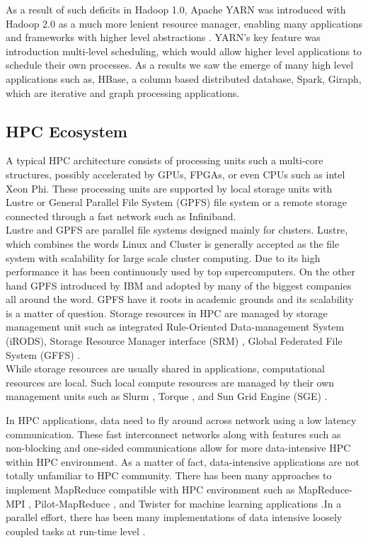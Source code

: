 \documentclass[runningheads,a4paper]{llncs}
\begin{document}
As a result of such deficits in Hadoop 1.0, Apache YARN was introduced with Hadoop 2.0 as a much more lenient resource manager, enabling many applications and frameworks with higher level abstractions \cite{vavilapalli2013apache}. YARN's key feature was introduction multi-level scheduling, which would allow higher level applications to schedule their own processes. As a results we saw the emerge of many high level applications such as, HBase, a column based distributed database, Spark, Giraph, which are iterative and graph processing applications\cite{borthakur2011apache}\cite{zaharia2012resilient}.
\newpage
\newpage
\subsection{HPC Ecosystem}
A typical HPC architecture consists of processing units such a multi-core structures, possibly accelerated by GPUs, FPGAs, or even CPUs such as intel Xeon Phi. These processing units are supported by local storage units with Lustre \cite{braam2004lustre} or General Parallel File System (GPFS) \cite{FrankSchmuck} file system or a remote storage connected through a fast network such as Infiniband.\\

Lustre and GPFS are parallel file systems designed mainly for clusters. Lustre, which combines the words Linux and Cluster is generally accepted as the file system with scalability for large scale cluster computing. Due to its high performance it has been continuously used by top supercomputers. On the other hand GPFS introduced by IBM and adopted by many of the biggest companies all around the word. GPFS have it roots in academic grounds and its scalability is a matter of question. Storage resources in HPC are managed by storage management unit such as integrated Rule-Oriented Data-management System (iRODS), Storage Resource Manager interface (SRM) \cite{shaun2007storage} \cite{rajasekar2010irods},  Global Federated File System (GFFS) \cite{grimshaw2013gffs}.\\

While storage resources are usually shared in applications, computational resources are local. Such local compute resources are managed by their own management units such as Slurm \cite{yoo2003slurm}, Torque \cite{staples2006torque}, and Sun Grid Engine (SGE) \cite{gentzsch2001sun}.

In HPC applications, data need to fly around across network using a low latency communication. These fast interconnect networks along with features such as non-blocking and one-sided communications allow for more data-intensive HPC within HPC environment. As a matter of fact, data-intensive applications are not totally unfamiliar to HPC community. There has been many approaches to implement MapReduce compatible with HPC environment such as MapReduce-MPI \cite{plimpton2011mapreduce}, Pilot-MapReduce \cite{mantha2012pilot}, and Twister for machine learning applications \cite{ekanayake2010twister}.In a parallel effort, there has been many implementations of data intensive loosely coupled tasks at run-time level \cite{luckow2012p}\cite{raicu2008many}\cite{deelman2009workflows}.
\newpage
\end{document}
